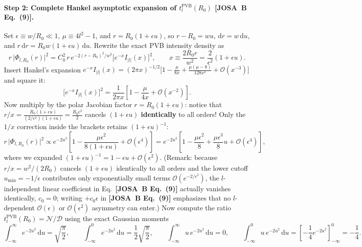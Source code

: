\documentclass[10pt,letterpaper]{article}
\newcommand{\abs}[1]{\lvert #1 \rvert}
\newcommand{\dd}{\mathrm{d}}
\newcommand{\josb}[1]{\textbf{[JOSA~B Eq.~(#1)]}}
\numberwithin{equation}{section}
\begin{document}
\paragraph*{Step 2: Complete Hankel asymptotic expansion of $t_l^{\mathrm{PVB}}(R_0)$ \josb{9}.}
Set $\epsilon \equiv w/R_0 \ll 1$, $\mu \equiv 4l^2 - 1$, and $r = R_0(1 + \epsilon u)$, so $r - R_0 = w u$, $\dd r = w\,\dd u$, and $r\,\dd r = R_0 w(1 + \epsilon u)\,\dd u$. Rewrite the exact PVB intensity density as
\begin{equation}
  r\,\abs{\Phi_{l,R_0}(r)}^2 = C_0^2\,r\,e^{-2(r-R_0)^2/w^2}\bigl[e^{-x} I_{\abs{l}}(x)\bigr]^2, \qquad x \equiv \frac{2R_0 r}{w^2} = \frac{2}{\epsilon^2}(1 + \epsilon u).
\end{equation}
Insert Hankel's expansion $e^{-x} I_{\abs{l}}(x) = (2\pi x)^{-1/2}\bigl[1 - \frac{\mu}{8x} + \frac{\mu(\mu-8)}{128 x^2} + \mathcal{O}(x^{-3})\bigr]$ and square it:
\begin{equation}
  \bigl[e^{-x} I_{\abs{l}}(x)\bigr]^2 = \frac{1}{2\pi x}\left[1 - \frac{\mu}{4x} + \mathcal{O}(x^{-2})\right].
\end{equation}
Now multiply by the polar Jacobian factor $r = R_0(1+\epsilon u)$: notice that $r / x = \frac{R_0(1+\epsilon u)}{(2/\epsilon^2)(1+\epsilon u)} = \frac{R_0\epsilon^2}{2}$ cancels $(1+\epsilon u)$ \textbf{identically} to all orders! Only the $1/x$ correction inside the brackets retains $(1+\epsilon u)^{-1}$:
\begin{equation}
  r\,\abs{\Phi_{l,R_0}(r)}^2 \propto e^{-2u^2}\left[1 - \frac{\mu\epsilon^2}{8(1+\epsilon u)} + \mathcal{O}(\epsilon^4)\right] = e^{-2u^2}\left[1 - \frac{\mu\epsilon^2}{8} + \frac{\mu\epsilon^3}{8} u + \mathcal{O}(\epsilon^4)\right],
\end{equation}
where we expanded $(1+\epsilon u)^{-1} = 1 - \epsilon u + \mathcal{O}(\epsilon^2)$. (Remark: because $r/x = w^2/(2R_0)$ cancels $(1+\epsilon u)$ identically to all orders and the lower cutoff $u_{\min} = -1/\epsilon$ contributes only exponentially small terms $\mathcal{O}(e^{-2/\epsilon^2})$, the $l$-independent linear coefficient in Eq.~\josb{9} actually vanishes identically, $c_0 = 0$; writing $+c_0\epsilon$ in \josb{9} emphasizes that no $l$-dependent $\mathcal{O}(\epsilon)$ or $\mathcal{O}(\epsilon^2)$ asymmetry can enter.) Now compute the ratio $t_l^{\mathrm{PVB}}(R_0) = \mathcal{N}/\mathcal{D}$ using the exact Gaussian moments
\begin{equation}
  \int_{-\infty}^\infty e^{-2u^2}\,\dd u = \sqrt{\frac{\pi}{2}}, \qquad \int_{-\infty}^0 e^{-2u^2}\,\dd u = \frac{1}{2}\sqrt{\frac{\pi}{2}}, \qquad \int_{-\infty}^\infty u\,e^{-2u^2}\,\dd u = 0, \qquad \int_{-\infty}^0 u\,e^{-2u^2}\,\dd u = \left[-\frac{1}{4}e^{-2u^2}\right]_{-\infty}^0 = -\frac{1}{4}.
\end{equation}
\end{document}
